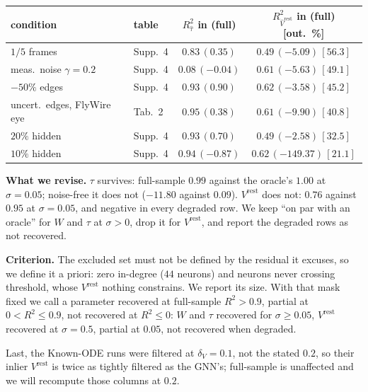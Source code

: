 \begin{center}
{\footnotesize
\begin{tabular}{llcc}
\toprule
condition & table
  & $R^2_{\widehat{\tau}}$ in (full)
  & $R^2_{\widehat{V}^{\mathrm{rest}}}$ in (full) [out.\ \%] \\
\midrule
$1/5$ frames               & Supp.~4 & $0.83\,(0.35)$  & $0.49\,(-5.09)\,[56.3]$ \\
meas.\ noise $\gamma=0.2$  & Supp.~4 & $0.08\,(-0.04)$ & $0.61\,(-5.63)\,[49.1]$ \\
$-50\%$ edges              & Supp.~4 & $0.93\,(0.90)$  & $0.62\,(-3.58)\,[45.2]$ \\
uncert.\ edges, FlyWire eye& Tab.~2  & $0.95\,(0.38)$  & $0.61\,(-9.90)\,[40.8]$ \\
$20\%$ hidden              & Supp.~4 & $0.93\,(0.70)$  & $0.49\,(-2.58)\,[32.5]$ \\
$10\%$ hidden              & Supp.~4 & $0.94\,(-0.87)$ & $0.62\,(-149.37)\,[21.1]$ \\
\bottomrule
\end{tabular}}
\end{center}

\textbf{What we revise.} $\tau$ survives: full-sample $0.99$ against the oracle's
$1.00$ at $\sigma = 0.05$; noise-free it does not ($-11.80$ against $0.09$).
$V^{\mathrm{rest}}$ does not: $0.76$ against $0.95$ at $\sigma = 0.05$, and
negative in every degraded row. We keep ``on par with an oracle'' for $W$ and
$\tau$ at $\sigma > 0$, drop it for $V^{\mathrm{rest}}$, and report the degraded
rows as not recovered.

\textbf{Criterion.} The excluded set must not be defined by the residual it
excuses, so we define it a priori: zero in-degree ($44$ neurons) and neurons
never crossing threshold, whose $V^{\mathrm{rest}}$ nothing constrains. We report
its size. With that mask fixed we call a parameter recovered at
full-sample $R^2 > 0.9$, partial at $0 < R^2 \leq 0.9$, not recovered at
$R^2 \leq 0$: $W$ and $\tau$ recovered for $\sigma \geq 0.05$,
$V^{\mathrm{rest}}$ recovered at $\sigma = 0.5$, partial at $0.05$, not recovered
when degraded.

Last, the Known-ODE runs were filtered at $\delta_{V} = 0.1$, not the stated
$0.2$, so their inlier $V^{\mathrm{rest}}$ is twice as tightly filtered as the
GNN's; full-sample is unaffected and we will recompute those columns at $0.2$.
